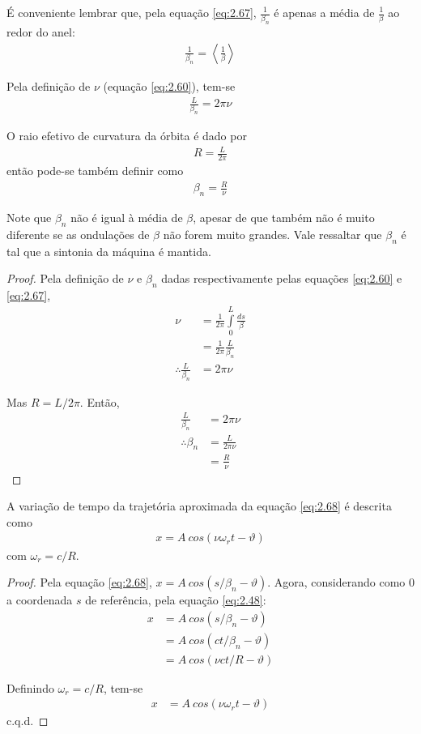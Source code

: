 É conveniente lembrar que, pela equação \eqref{eq:2.67}, $\frac{1}{\beta_n}$ é apenas a média de $\frac{1}{\beta}$ ao redor do anel:
\begin{align}
	\frac{1}{\beta_n} = \left \langle \frac{1}{\beta} \right \rangle
\end{align}

Pela definição de $\nu$ (equação \eqref{eq:2.60}), tem-se
\begin{align}
	\frac{L}{\beta_n} = 2\pi \nu
\end{align}

O raio efetivo de curvatura da órbita é dado por
\begin{align}
	R = \frac{L}{2\pi}
\end{align}
então pode-se também definir como
\begin{align}
	\beta_n = \frac{R}{\nu}
\end{align}

Note que $\beta_n$ não é igual à média de $\beta$, apesar de que também não é muito diferente se as ondulações de $\beta$ não forem muito grandes. Vale ressaltar que $\beta_n$ é tal que a sintonia da máquina é mantida.

\begin{proof}
	Pela definição de $\nu$ e $\beta_n$ dadas respectivamente pelas equações \eqref{eq:2.60} e \eqref{eq:2.67},
	\begin{align*}
		\nu &= \frac{1}{2\pi} \int\limits_{0}^{L}\frac{ds}{\beta}\\
			&= \frac{1}{2\pi} \frac{L}{\beta_n}\\
		\therefore \frac{L}{\beta_n} &= 2\pi \nu
	\end{align*}
	
	Mas $R = L/2\pi$. Então,
	\begin{align*}
		\frac{L}{\beta_n} &= 2\pi \nu\\
		\therefore \beta_n &= \frac{L}{2\pi \nu}\\
						   &= \frac{R}{\nu}
	\end{align*}
\end{proof}

A variação de tempo da trajetória aproximada da equação \eqref{eq:2.68} é descrita como
\begin{align}
	x = A\ cos(\nu \omega_r t - \vartheta)
\end{align}
com $\omega_r = c/R$.

\begin{proof}
	Pela equação \eqref{eq:2.68}, $x = A\ cos(s/\beta_n - \vartheta)$. Agora, considerando como 0 a coordenada $s$ de referência, pela equação \eqref{eq:2.48}:
	\begin{align*}
		x &= A\ cos(s/\beta_n - \vartheta)\\
		  &= A\ cos(ct/\beta_n - \vartheta)\\
		  &= A\ cos(\nu c t/R - \vartheta)
	\end{align*}
	
	Definindo $\omega_r = c/R$, tem-se
	\begin{align*}
		x &= A\ cos(\nu \omega_r t - \vartheta)
	\end{align*}
	c.q.d.
\end{proof}

